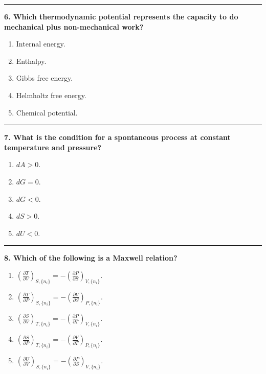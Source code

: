 \documentclass[
  9pt,
]{extbook}
\providecommand{\tightlist}{%
  \setlength{\itemsep}{0pt}\setlength{\parskip}{0pt}}
\theoremstyle{definition}
\theoremstyle{definition}
\theoremstyle{definition}
\theoremstyle{remark}
\begin{document}
\begin{center}\rule{0.5\linewidth}{0.5pt}\end{center}

\textbf{6. Which thermodynamic potential represents the capacity to do mechanical plus non-mechanical work?}

\begin{enumerate}
\def\labelenumi{\alph{enumi}.}
\tightlist
\item
  Internal energy.
\item
  Enthalpy.
\item
  Gibbs free energy.
\item
  Helmholtz free energy.
\item
  Chemical potential.
\end{enumerate}

\begin{center}\rule{0.5\linewidth}{0.5pt}\end{center}

\textbf{7. What is the condition for a spontaneous process at constant temperature and pressure?}

\begin{enumerate}
\def\labelenumi{\alph{enumi}.}
\tightlist
\item
  \(dA > 0\).
\item
  \(dG = 0\).
\item
  \(dG < 0\).
\item
  \(dS > 0\).
\item
  \(dU < 0\).
\end{enumerate}

\begin{center}\rule{0.5\linewidth}{0.5pt}\end{center}

\textbf{8. Which of the following is a Maxwell relation?}

\begin{enumerate}
\def\labelenumi{\alph{enumi}.}
\tightlist
\item
  \(\left(\frac{\partial T}{\partial V}\right)_{S,\{n_i\}} = -\left(\frac{\partial P}{\partial S}\right)_{V,\{n_i\}}\).
\item
  \(\left(\frac{\partial T}{\partial P}\right)_{S,\{n_i\}} = -\left(\frac{\partial V}{\partial S}\right)_{P,\{n_i\}}\).
\item
  \(\left(\frac{\partial S}{\partial V}\right)_{T,\{n_i\}} = -\left(\frac{\partial P}{\partial T}\right)_{V,\{n_i\}}\).
\item
  \(\left(\frac{\partial S}{\partial P}\right)_{T,\{n_i\}} = -\left(\frac{\partial V}{\partial T}\right)_{P,\{n_i\}}\).
\item
  \(\left(\frac{\partial U}{\partial V}\right)_{S,\{n_i\}} = -\left(\frac{\partial P}{\partial S}\right)_{V,\{n_i\}}\).
\end{enumerate}
\end{document}
